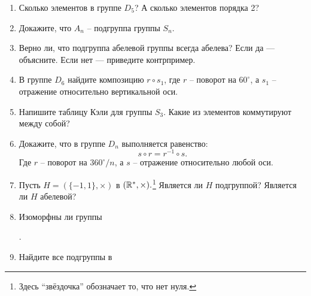 \begin{enumerate}
    \item Сколько элементов в группе $D_5$? А сколько элементов порядка 2?
    \item Докажите, что $A_n$ -- подгруппа группы $S_n$.
    \item Верно ли, что подгруппа абелевой группы всегда абелева? Если да — объясните. Если нет — приведите контрпример.
    \item В группе $D_6$ найдите композицию $r \circ s_1$, где $r$ -- поворот на $60^\circ$, а $s_1$ -- отражение относительно вертикальной оси.
    \item Напишите таблицу Кэли для группы $S_3$. Какие из элементов коммутируют между собой?
    \item Докажите, что в группе $D_n$ выполняется равенство: \[
            s \circ r = r^{-1} \circ s.
        \]
        Где $r$ -- поворот на $360^\circ/n$, а $s$ -- отражение относительно любой оси.
    \item Пусть $H = (\{-1, 1\}, \times)$ в $(\mathbb R^*, \times).$\footnote{Здесь ``звёздочка'' обозначает то, что нет нуля.} Является ли $H$ подгруппой? Является ли $H$ абелевой?
    \item Изоморфны ли группы
        .
    \item Найдите все подгруппы в 
\end{enumerate}
